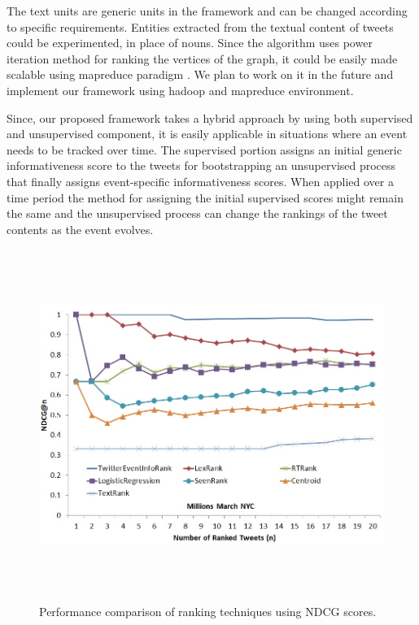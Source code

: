 The text units are generic units in the framework and can be changed according to specific requirements. Entities extracted from the textual content of tweets could be experimented, in place of nouns. Since the algorithm uses power iteration method for ranking the vertices of the graph, it could be easily made scalable using mapreduce paradigm \cite{lin2010design}. We plan to work on it in the future and implement our framework using hadoop and mapreduce environment. 

Since, our proposed framework takes a hybrid approach by using both supervised and unsupervised component, it is easily applicable in situations where an event needs to be tracked over time. The supervised portion assigns an initial generic informativeness score to the tweets for bootstrapping an unsupervised process that finally assigns event-specific informativeness scores. When applied over a time period the method for assigning the initial supervised scores might remain the same and the unsupervised process can change the rankings of the tweet contents as the event evolves. 



\begin{figure}[htbp]
\centering
\includegraphics[height=4.5in,width=6in]{Figures/Chapter4Figures/MillionsMarchNycEventIdentityInfoRankPerformance.jpg}
\caption{\small Performance comparison of ranking techniques using NDCG scores.}
\label{millionsmarchndcg}
\end{figure}

